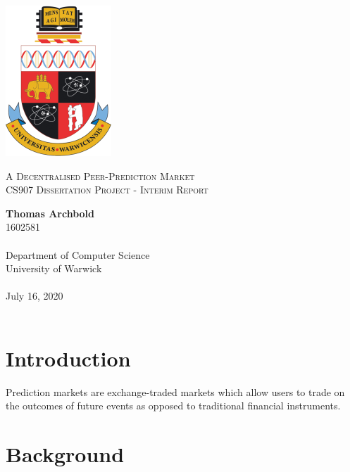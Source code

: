 \documentclass[10pt,a4paper]{article}
\theoremstyle{plain}
\theoremstyle{definition}
\begin{document}
\begin{titlepage}
    \begin{center}

        \vspace*{2cm}
        \includegraphics[width=.25\textwidth]{crest.png}

        \vspace*{1cm}
		{\Large \textsc{A Decentralised Peer-Prediction Market}} \\
		{\textsc{CS907 Dissertation Project - Interim Report}}

        \vspace*{1cm}
        \textbf{Thomas Archbold} \\
		1602581 \\~\\
        Department of Computer Science \\
        University of Warwick \\~\\

        July 16, 2020 \\~\\

        \vfill

    \end{center}
\end{titlepage}

\section{Introduction}

Prediction markets are exchange-traded markets which allow users to trade on
the outcomes of future events as opposed to traditional financial
instruments.


\section{Background}
\end{document}
